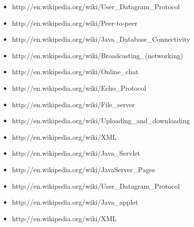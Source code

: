 \begin{enumerate}
\begin{itemize}
		\item http://en.wikipedia.org/wiki/User\_Datagram\_Protocol
		\item http://en.wikipedia.org/wiki/Peer-to-peer
		\item http://en.wikipedia.org/wiki/Java\_Database\_Connectivity
		\item http://en.wikipedia.org/wiki/Broadcasting\_(networking)
		\item http://en.wikipedia.org/wiki/Online\_chat
		\item http://en.wikipedia.org/wiki/Echo\_Protocol
		\item http://en.wikipedia.org/wiki/File\_server
		\item http://en.wikipedia.org/wiki/Uploading\_and\_downloading
		\item http://en.wikipedia.org/wiki/XML
		\item http://en.wikipedia.org/wiki/Java\_Servlet
		\item http://en.wikipedia.org/wiki/JavaServer\_Pages
		\item http://en.wikipedia.org/wiki/User\_Datagram\_Protocol
		\item http://en.wikipedia.org/wiki/Java\_applet
		\item http://en.wikipedia.org/wiki/XML
	\end{itemize}
	
\end{enumerate}